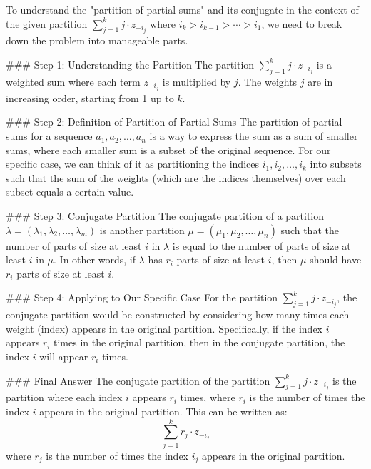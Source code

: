 To understand the "partition of partial sums" and its conjugate in the context of the given partition \(\sum_{j=1}^k j \cdot z_{-i_j}\) where \(i_k > i_{k-1} > \cdots > i_1\), we need to break down the problem into manageable parts.

### Step 1: Understanding the Partition
The partition \(\sum_{j=1}^k j \cdot z_{-i_j}\) is a weighted sum where each term \(z_{-i_j}\) is multiplied by \(j\). The weights \(j\) are in increasing order, starting from 1 up to \(k\).

### Step 2: Definition of Partition of Partial Sums
The partition of partial sums for a sequence \(a_1, a_2, \ldots, a_n\) is a way to express the sum as a sum of smaller sums, where each smaller sum is a subset of the original sequence. For our specific case, we can think of it as partitioning the indices \(i_1, i_2, \ldots, i_k\) into subsets such that the sum of the weights (which are the indices themselves) over each subset equals a certain value.

### Step 3: Conjugate Partition
The conjugate partition of a partition \(\lambda = (\lambda_1, \lambda_2, \ldots, \lambda_m)\) is another partition \(\mu = (\mu_1, \mu_2, \ldots, \mu_n)\) such that the number of parts of size at least \(i\) in \(\lambda\) is equal to the number of parts of size at least \(i\) in \(\mu\). In other words, if \(\lambda\) has \(r_i\) parts of size at least \(i\), then \(\mu\) should have \(r_i\) parts of size at least \(i\).

### Step 4: Applying to Our Specific Case
For the partition \(\sum_{j=1}^k j \cdot z_{-i_j}\), the conjugate partition would be constructed by considering how many times each weight (index) appears in the original partition. Specifically, if the index \(i\) appears \(r_i\) times in the original partition, then in the conjugate partition, the index \(i\) will appear \(r_i\) times.

### Final Answer
The conjugate partition of the partition \(\sum_{j=1}^k j \cdot z_{-i_j}\) is the partition where each index \(i\) appears \(r_i\) times, where \(r_i\) is the number of times the index \(i\) appears in the original partition. This can be written as:
\[
\boxed{\sum_{j=1}^k r_j \cdot z_{-i_j}}
\]
where \(r_j\) is the number of times the index \(i_j\) appears in the original partition.